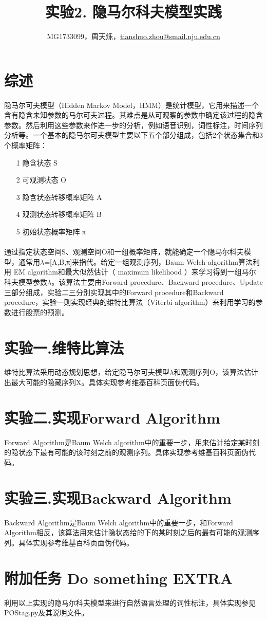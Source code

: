 \documentclass[a4paper,UTF8]{article}
\theoremstyle{definition}
\begin{document}
\title{实验2. 隐马尔科夫模型实践}
\author{MG1733099，周天烁，\url{tianshuo.zhou@smail.nju.edu.cn}}
\maketitle

\section*{综述}
	隐马尔可夫模型（Hidden Markov Model，HMM）是统计模型，它用来描述一个含有隐含未知参数的马尔可夫过程。其难点是从可观察的参数中确定该过程的隐含参数。然后利用这些参数来作进一步的分析，例如语音识别，词性标注，时间序列分析等。一个基本的隐马尔可夫模型主要以下五个部分组成，包括2个状态集合和3个概率矩阵：
    \begin{itemize}
    \item[1]  隐含状态 S
    \item[2]  可观测状态 O
    \item[3]  隐含状态转移概率矩阵 A
    \item[4]  观测状态转移概率矩阵 B
    \item[5]  初始状态概率矩阵 π
    \end{itemize}
    \paragraph{} 通过指定状态空间S、观测空间O和一组概率矩阵，就能确定一个隐马尔科夫模型，通常用$\lambda$=[A,B,π]来指代。给定一组观测序列，Baum Welch algorithm算法利用 EM algorithm和最大似然估计（ maximum likelihood ）来学习得到一组马尔科夫模型参数$\lambda$。该算法主要由Forward procedure、Backward procedure、Update三部分组成，实验二三分别实现其中的Forward procedure和Backward procedure，实验一则实现经典的维特比算法（Viterbi algorithm）来利用学习的参数进行股票的预测。
	
\section*{实验一.维特比算法}
	维特比算法采用动态规划思想，给定隐马尔可夫模型$\lambda$和观测序列O，该算法估计出最大可能的隐藏序列X。具体实现参考维基百科页面伪代码。

\section*{实验二.实现Forward Algorithm}
	Forward Algorithm是Baum Welch algorithm中的重要一步，用来估计给定某时刻的隐状态下最有可能的该时刻之前的观测序列。具体实现参考维基百科页面伪代码。

\section*{实验三.实现Backward Algorithm }
	Backward Algorithm是Baum Welch algorithm中的重要一步，和Forward Algorithm相反，该算法用来估计隐状态给的下的某时刻之后的最有可能的观测序列。具体实现参考维基百科页面伪代码。

\section*{附加任务  Do something EXTRA }
    利用以上实现的隐马尔科夫模型来进行自然语言处理的词性标注，具体实现参见POStag.py及其说明文件。
\end{document}
